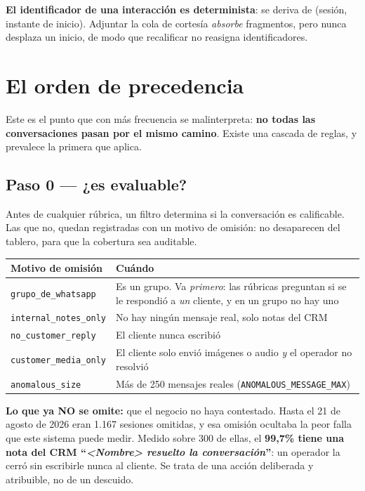 \documentclass[11pt,a4paper]{article}
\newcommand{\cod}[1]{\texttt{\small #1}}
\begin{document}
\begin{nota}
\textbf{El identificador de una interacción es determinista}: se deriva de
(sesión, instante de inicio). Adjuntar la cola de cortesía \emph{absorbe} fragmentos, pero
nunca desplaza un inicio, de modo que recalificar no reasigna identificadores.
\end{nota}

\newpage
\section{El orden de precedencia}

Este es el punto que con más frecuencia se malinterpreta: \textbf{no todas las
conversaciones pasan
por el mismo camino}. Existe una cascada de reglas, y prevalece la primera que aplica.

\subsection{Paso 0 --- ¿es evaluable?}

Antes de cualquier rúbrica, un filtro determina si la conversación es calificable.
Las que no, quedan registradas con un motivo de omisión: no desaparecen del tablero,
para que la cobertura sea auditable.

\begin{center}
\begin{tabularx}{\textwidth}{@{}lX@{}}
\toprule
\textbf{Motivo de omisión} & \textbf{Cuándo} \\
\midrule
\cod{grupo\_de\_whatsapp} & Es un grupo. Va \emph{primero}: las rúbricas preguntan si
se le respondió a \emph{un} cliente, y en un grupo no hay uno \\
\cod{internal\_notes\_only} & No hay ningún mensaje real, solo notas del CRM \\
\cod{no\_customer\_reply} & El cliente nunca escribió \\
\cod{customer\_media\_only} & El cliente solo envió imágenes o audio \emph{y} el
operador no resolvió \\
\cod{anomalous\_size} & Más de 250 mensajes reales (\cod{ANOMALOUS\_MESSAGE\_MAX}) \\
\bottomrule
\end{tabularx}
\end{center}

\begin{alerta}
\textbf{Lo que ya NO se omite:} que el negocio no haya contestado. Hasta el 21 de
agosto de 2026 eran 1.167 sesiones omitidas, y esa omisión ocultaba la peor falla que
este sistema puede medir. Medido sobre 300 de ellas, el \textbf{99,7\% tiene una nota
del CRM ``\emph{<Nombre> resuelto la conversación}''}: un operador la cerró sin
escribirle nunca al cliente. Se trata de una acción deliberada y atribuible, no de un
descuido.
\end{alerta}
\end{document}
